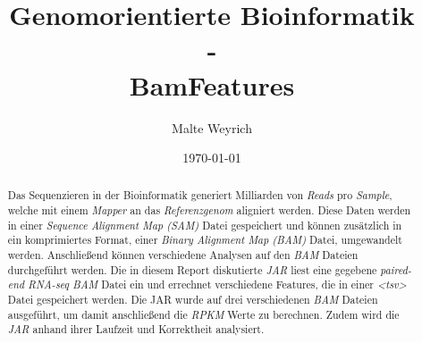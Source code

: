 \documentclass[12pt]{article}
\title{Genomorientierte Bioinformatik \\ - \\ BamFeatures}
\author{Malte Weyrich}
\date{\today}
\begin{document}
\maketitle
\begin{abstract}
Das Sequenzieren in der Bioinformatik generiert Milliarden von \textit{Reads} pro \textit{Sample}, welche mit
einem \textit{Mapper} an das \textit{Referenzgenom} aligniert werden. 
Diese Daten werden in einer \textit{Sequence Alignment Map (SAM)} Datei gespeichert und können zusätzlich in ein komprimiertes Format,
einer \textit{Binary Alignment Map (BAM)} Datei, umgewandelt werden. Anschließend können verschiedene Analysen auf
den \textit{BAM} Dateien durchgeführt werden. Die in diesem Report diskutierte \textit{JAR} liest eine gegebene
\textit{paired-end RNA-seq BAM} Datei ein und errechnet verschiedene Features, die in einer \textit{<tsv>} Datei
gespeichert werden. Die JAR wurde auf drei verschiedenen \textit{BAM} Dateien ausgeführt, um damit
anschließend die \textit{RPKM} Werte zu berechnen. Zudem wird die \textit{JAR} anhand ihrer Laufzeit und
Korrektheit analysiert.

\end{abstract}

\newpage
\tableofcontents
\newpage



\end{document}
